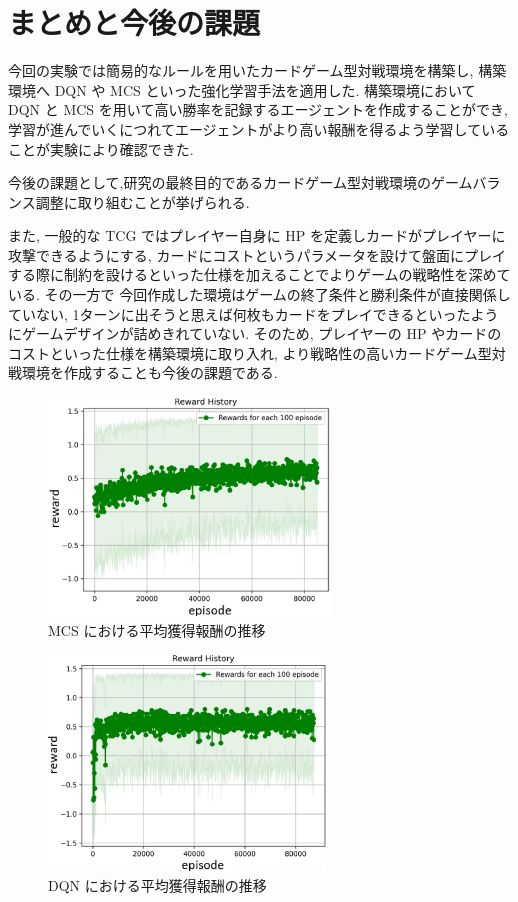 \documentclass[twocolumn]{jarticle}
\begin{document}
\section{まとめと今後の課題}
今回の実験では簡易的なルールを用いたカードゲーム型対戦環境を構築し, 構築環境へ DQN や MCS といった強化学習手法を適用した. 構築環境において DQN と MCS を用いて高い勝率を記録するエージェントを作成することができ, 学習が進んでいくにつれてエージェントがより高い報酬を得るよう学習していることが実験により確認できた.
\par
今後の課題として,研究の最終目的であるカードゲーム型対戦環境のゲームバランス調整に取り組むことが挙げられる. 
\par
また, 一般的な TCG ではプレイヤー自身に HP を定義しカードがプレイヤーに攻撃できるようにする, カードにコストというパラメータを設けて盤面にプレイする際に制約を設けるといった仕様を加えることでよりゲームの戦略性を深めている. その一方で
今回作成した環境はゲームの終了条件と勝利条件が直接関係していない, 1ターンに出そうと思えば何枚もカードをプレイできるといったようにゲームデザインが詰めきれていない. そのため, プレイヤーの HP やカードのコストといった仕様を構築環境に取り入れ, より戦略性の高いカードゲーム型対戦環境を作成することも今後の課題である.

\begin{figure}[H]
  \centering
  \includegraphics[width=75mm]{assets/MCS_update.eps.eps}
  \caption{MCS における平均獲得報酬の推移}
  \label{fig:MCSresult}
\end{figure}

\begin{figure}[H]
  \centering
  \includegraphics[width=73.5mm]{assets/DQN_update.eps}
  \caption{DQN における平均獲得報酬の推移}
  \label{fig:DQNresult}
\end{figure}






\end{document}
